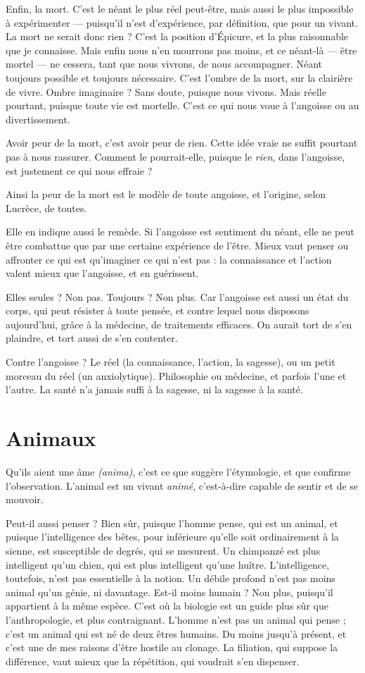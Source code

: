 Enfin, la mort. C’est le néant le plus réel peut-être, mais aussi le plus
impossible à expérimenter — puisqu'il n’est d'expérience, par définition, que
pour un vivant. La mort ne serait donc rien ? C’est la position d’Épicure, et la
plus raisonnable que je connaisse. Mais enfin nous n’en mourrons pas moins,
et ce néant-là — être mortel — ne cessera, tant que nous vivrons, de nous accompagner.
Néant toujours possible et toujours nécessaire. C’est l’ombre de la
mort, sur la clairière de vivre. Ombre imaginaire ? Sans doute, puisque nous
vivons. Mais réelle pourtant, puisque toute vie est mortelle. C’est ce qui nous
voue à l’angoisse ou au divertissement.

Avoir peur de la mort, c’est avoir peur de rien. Cette idée vraie ne suffit
pourtant pas à nous rassurer. Comment le pourrait-elle, puisque le {\it rien}, dans
l'angoisse, est justement ce qui nous effraie ?

Ainsi la peur de la mort est le modèle de toute angoisse, et l’origine, selon
Lucrèce, de toutes.

Elle en indique aussi le remède. Si l'angoisse est sentiment du néant, elle ne
peut être combattue que par une certaine expérience de l'être. Mieux vaut
penser ou affronter ce qui est qu’imaginer ce qui n’est pas : la connaissance et
l’action valent mieux que l’angoisse, et en guérissent.

Elles seules ? Non pas. Toujours ? Non plus. Car l'angoisse est aussi un état
du corps, qui peut résister à toute pensée, et contre lequel nous disposons
aujourd’hui, grâce à la médecine, de traitements efficaces. On aurait tort de
s’en plaindre, et tort aussi de s’en contenter.

Contre l’angoisse ? Le réel (la connaissance, l’action, la sagesse), ou un petit
morceau du réel (un anxiolytique). Philosophie ou médecine, et parfois l’une et
l’autre. La santé n’a jamais suffi à la sagesse, ni la sagesse à la santé.

\section{Animaux}
Qu'ils aient une âme {\it (anima)}, c’est ce que suggère l’étymologie,
et que confirme l'observation. L'animal est un vivant {\it animé},
c’est-à-dire capable de sentir et de se mouvoir.

Peut-il aussi penser ? Bien sûr, puisque l’homme pense, qui est un animal,
et puisque l'intelligence des bêtes, pour inférieure qu’elle soit ordinairement à
la sienne, est susceptible de degrés, qui se mesurent. Un chimpanzé est plus
intelligent qu’un chien, qui est plus intelligent qu’une huître. L'intelligence,
toutefois, n’est pas essentielle à la notion. Un débile profond n’est pas moins
animal qu’un génie, ni davantage. Est-il moins humain ? Non plus, puisqu'il
appartient à la même espèce. C’est où la biologie est un guide plus sûr que
l'anthropologie, et plus contraignant. L'homme n’est pas un animal qui pense ;
c’est un animal qui est né de deux êtres humains. Du moins jusqu’à présent, et
c’est une de mes raisons d’être hostile au clonage. La filiation, qui suppose la
différence, vaut mieux que la répétition, qui voudrait s’en dispenser.

